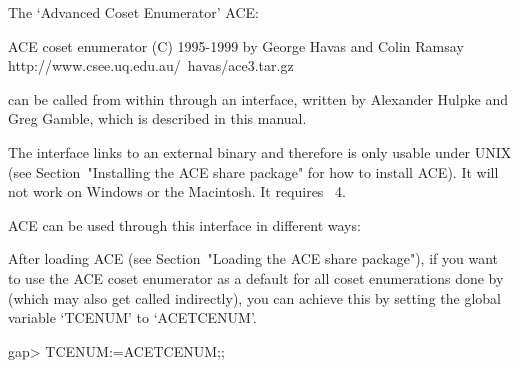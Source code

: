 
\def\ACE{{\sf ACE}}

The  \lq{}Advanced Coset Enumerator' {\ACE}:

\begintt
ACE coset enumerator (C) 1995-1999 by George Havas and Colin Ramsay
    http://www.csee.uq.edu.au/~havas/ace3.tar.gz
\endtt

can  be called  from within  {\GAP} through  an interface,  written by
Alexander Hulpke and Greg Gamble, which is described in this manual.

The interface links to an external binary and therefore is only usable
under UNIX (see Section~"Installing the ACE share package" for how  to
install {\ACE}).  It will not work  on  Windows  or the Macintosh.  It
requires {\GAP}~4.

{\ACE} can be used through this interface in different ways:


After loading  {\ACE}   (see Section~"Loading the ACE share package"),
if you  want to use the {\ACE}  coset enumerator as a  default for all
coset  enumerations  done  by   {\GAP}  (which  may  also  get  called
indirectly),  you can  achieve  this by  setting  the global  variable
`TCENUM' to `ACETCENUM'.

\begintt
gap> TCENUM:=ACETCENUM;;
\endtt

